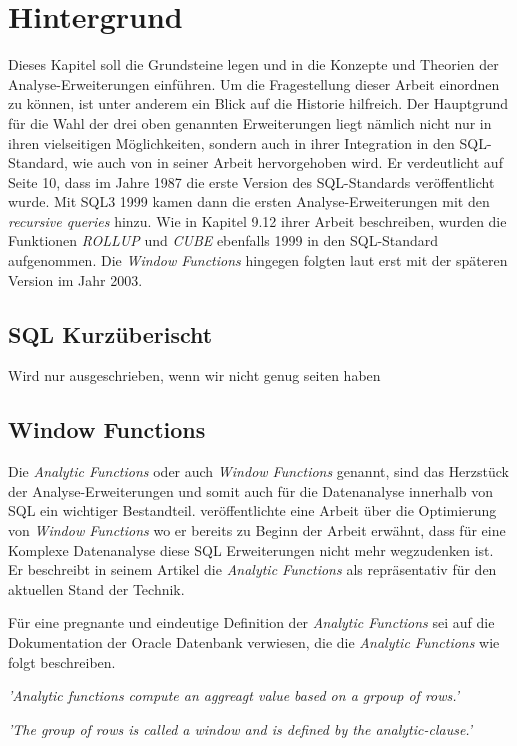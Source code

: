 \chapter{Hintergrund}
Dieses Kapitel soll die Grundsteine legen und in die Konzepte und Theorien der Analyse-Erweiterungen
einführen. Um die Fragestellung dieser Arbeit einordnen zu können, ist unter anderem
ein Blick auf die Historie hilfreich. Der Hauptgrund für die Wahl der drei oben
genannten Erweiterungen liegt nämlich nicht nur in ihren vielseitigen
Möglichkeiten, sondern auch in ihrer Integration in den SQL-Standard, wie auch
von \cite{grust2017advanced} in seiner Arbeit hervorgehoben wird. Er verdeutlicht
auf Seite 10, dass im Jahre 1987 die erste Version des SQL-Standards
veröffentlicht wurde. Mit SQL3 1999 kamen dann die ersten Analyse-Erweiterungen mit
den \textit{recursive queries} hinzu. Wie \cite{melton2001sql} in Kapitel 9.12 ihrer
Arbeit beschreiben, wurden die Funktionen \textit{ROLLUP} und \textit{CUBE}
ebenfalls 1999 in den SQL-Standard aufgenommen. Die \textit{Window Functions}
hingegen folgten laut \cite{grust2017advanced} erst mit der späteren Version im
Jahr 2003.

\section{SQL Kurzüberischt}
Wird nur ausgeschrieben, wenn wir nicht genug seiten haben

\section{Window Functions}
Die \textit{Analytic Functions} oder auch \textit{Window Functions} genannt,
sind das Herzstück der Analyse-Erweiterungen und somit auch für die Datenanalyse
innerhalb von SQL ein wichtiger Bestandteil. \cite{cao2012optimization} veröffentlichte
eine Arbeit über die Optimierung von \textit{Window Functions} wo er bereits zu
Beginn der Arbeit erwähnt, dass für eine Komplexe Datenanalyse diese SQL Erweiterungen
nicht mehr wegzudenken ist. Er beschreibt in seinem Artikel die \textit{Analytic
Functions} als repräsentativ für den aktuellen Stand der Technik.

Für eine pregnante und eindeutige Definition der \textit{Analytic Functions}
sei auf die Dokumentation der Oracle Datenbank verwiesen, die die \textit{Analytic
Functions} wie folgt beschreiben.

\begin{center}
	\textit{ 'Analytic functions compute an aggreagt value based on a grpoup of
	rows.' } \\ \cite{oracle}

	\textit{ 'The group of rows is called a window and is defined by the analytic-clause.'
	} \\ \cite{oracle}
\end{center}

